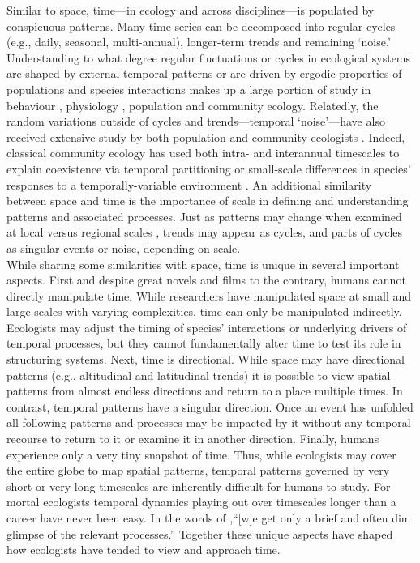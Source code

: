 \documentclass[11pt,a4paper,oneside]{article}
\begin{document}
Similar to space, time---in ecology and across disciplines---is populated by conspicuous patterns. Many time series can be decomposed into regular cycles (e.g., daily, seasonal, multi-annual), longer-term trends and remaining `noise.'  Understanding to what degree regular fluctuations or cycles in ecological systems are shaped by external temporal patterns or are driven by ergodic properties of populations and species interactions makes up a large portion of study in behaviour \citep{macarthur1958}, physiology \citep{Lambers:2008jb}, population  \citep{May1976,Gurney1985,Krebs2001,Yang:2004zd} and community \citep{Chesson:1997dz} ecology.  Relatedly, the random variations outside of cycles and trends---temporal `noise'---have also received extensive study by both population \citep{Ripa1996,Kaitala1997,Bjornstad:1999kl} and community ecologists \citep{Chesson:2000vd}. Indeed, classical community ecology has used both intra- \citep{parrish1979,Albrecht:2001id} and interannual \citep{Chesson:1997dz} timescales to explain coexistence via temporal partitioning or small-scale differences in species' responses to a temporally-variable environment \citep{macarthur1958,Hutchinson:1961ui}. An additional similarity between space and time is the importance of scale in defining and understanding patterns and associated processes. Just as patterns may change when examined at local versus regional scales \citep[e.g.,][]{Fridley:2007ct}, trends may appear as cycles, and parts of cycles as singular events or noise, depending on scale. \\

While sharing some similarities with space, time is unique in several important aspects. First and despite great novels and films to the contrary, humans cannot directly manipulate time. While researchers have manipulated space at small \citep[e.g.,][]{huffaker} and large \citep[e.g.,][]{Terborgh:2001bw} scales with varying complexities, time can only be manipulated indirectly. Ecologists may adjust the timing of species' interactions \citep{Yang:2010cq} or underlying drivers of temporal processes, but they cannot fundamentally alter time to test its role in structuring systems. Next, time is directional. While space may have directional patterns (e.g., altitudinal and latitudinal trends) it is possible to view spatial patterns from almost endless directions and return to a place multiple times. In contrast, temporal patterns have a singular direction. Once an event has unfolded all following patterns and processes may be impacted by it without any temporal recourse to return to it or examine it in another direction. Finally, humans experience only a very tiny snapshot of time. Thus, while ecologists may cover the entire globe to map spatial patterns, temporal patterns governed by very short or very long timescales are inherently difficult for humans to study. For mortal ecologists temporal dynamics playing out over timescales longer than a career have never been easy. In the words of \citet{wiens1986},``[w]e get only a brief and often dim glimpse of the relevant processes.'' Together these unique aspects have shaped how ecologists have tended to view and approach time. \\
\end{document}
